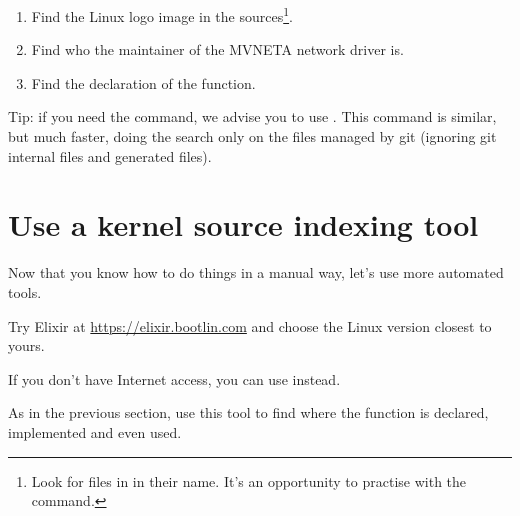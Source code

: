 \begin{enumerate}
\item Find the Linux logo image in the sources\footnote{Look for
      files in  in their name. It's an
      opportunity to practise with the  command.}.
\item Find who the maintainer of the MVNETA network driver is.
\item Find the declaration of the  function.
\end{enumerate}

Tip: if you need the  command, we advise you to use . This command is similar, but much faster, doing the search only
on the files managed by git (ignoring git internal files and generated
files).

\section{Use a kernel source indexing tool}

Now that you know how to do things in a manual way, let's use more
automated tools.

Try Elixir at \url{https://elixir.bootlin.com}
and choose the Linux version closest to yours.

If you don't have Internet access, you can use  instead.

As in the previous section, use this tool to find where
the  function is declared, implemented and
even used.
